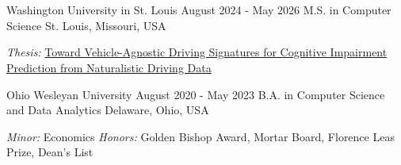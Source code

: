 \documentclass[10pt, letterpaper]{article}
\begin{document}
\vspace{\headerSpacing}


\section{}

\vspace{\entrySpacing}
\begin{educationentry}
	{Washington University in St. Louis}
	{August 2024 - May 2026}
	{M.S. in Computer Science}
	{St. Louis, Missouri, USA}
\begin{highlightsforbulletentries}
\item \textit{Thesis:} \href{https://doi.org/10.7936/g95n-fv35}{Toward Vehicle-Agnostic Driving Signatures for Cognitive Impairment Prediction from Naturalistic Driving Data}
\end{highlightsforbulletentries}
\end{educationentry}

\vspace{\entrySpacing}
\begin{educationentry}
	{Ohio Wesleyan University}
	{August 2020 - May 2023}
	{B.A. in Computer Science and Data Analytics}
	{Delaware, Ohio, USA}
\begin{highlightsforbulletentries}
\item \textit{Minor:} Economics \textbar{} \textit{Honors:} Golden Bishop Award, Mortar Board, Florence Leas Prize, Dean's List
\end{highlightsforbulletentries}
\end{educationentry}

\vspace{\headerSpacing}


\section{}
\end{document}
